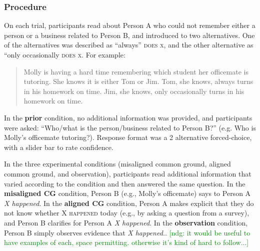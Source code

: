 \documentclass[10pt,letterpaper]{article}
\newcommand{\ndg}[1]{\textcolor{Green}{[ndg: #1]}}
\begin{document}
\subsubsection{Procedure}

On each trial, participants read about Person A who could not remember either a person or a business related to Person B, and introduced to two alternatives. 
One of the alternatives was described as ``always'' \textsc{does x}, and the other alternative as ``only occasionally \textsc{does x}. 
For example:
\begin{quote}
Molly is having a hard time remembering which student her officemate is tutoring.  
She knows it is either Tom or Jim. 
Tom, she knows, always turns in his homework on time.  
Jim, she knows, only occasionally turns in his homework on time.
\end{quote}

In the \textbf{prior} condition, no additional information was provided, and participants were asked: ``Who/what is the person/business related to Person B?'' (e.g. Who is Molly's officemate tutoring?).  Response format was a 2 alternative forced-choice, with a slider bar to rate confidence.

In the three experimental conditions (misaligned common ground, aligned common ground, and observation), participants read additional information that varied according to the condition and then answered the same question.
In the \textbf{misaligned CG} condition,  Person B (e.g., Molly's officemate) says to Person A \emph{X happened}. 
In the \textbf{aligned CG} condition, Person A makes explicit that they do not know whether \textsc{X happened} today (e.g., by asking a question from a survey), and Person B clarifies for Person A \emph{X happened}.
In the \textbf{observation} condition, Person B simply observes evidence that \emph{X happened.}.
\ndg{it would be useful to have examples of each, space permitting. otherwise it's kind of hard to follow...}
\end{document}
